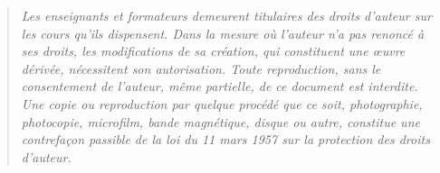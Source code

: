    \vspace {15cm}

   \begin {quote}
   \em Les enseignants et formateurs demeurent titulaires des droits d'auteur sur les cours qu'ils dispensent.    
Dans la mesure où l'auteur n'a pas renoncé à ses droits, les modifications de sa création, qui constituent une œuvre dérivée, nécessitent son autorisation. 
    Toute  reproduction,  sans le consentement de l'auteur, 
    même  partielle,  de ce document est
    interdite.  Une copie ou reproduction  par quelque procédé que
    ce   soit,   photographie,    photocopie,   microfilm,   bande
    magnétique,   disque  ou  autre,   constitue  une  contrefaçon
   passible  de la loi du 11  mars  1957  sur la  protection  des
    droits d'auteur.
    \end {quote}
\newpage


\setcounter{page}{1}

\tableofcontents
\newpage
~ %
\newpage

%
%
%



 \newpage

 \newpage


 \newpage
 \newpage
 \newpage
 \newpage
 \newpage



\newpage

 \newpage
 \newpage
 \newpage


 \newpage


 \newpage
 \newpage
 \newpage
 \newpage

